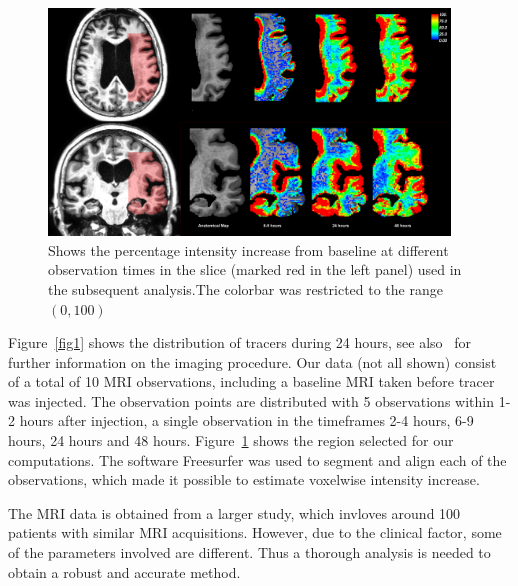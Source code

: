 \documentclass[11pt,a4paper]{article}
\begin{document}
\begin{figure}
\includegraphics[width=0.95\textwidth]{Zoom-PatID-68.png} 
\caption{Shows the percentage intensity increase from baseline at different observation times in the slice (marked red in the left panel) used in the subsequent analysis.The colorbar was restricted to the range $(0,100)$}
\label{fig2} 
\end{figure}
Figure~\ref{fig1} shows the distribution of tracers during 24 hours, see also~\cite{ringstad2018brain} for further information on the imaging procedure.   
Our data (not all shown) consist of a total of 10 MRI observations, including a baseline MRI taken before tracer was injected. The observation points are distributed with 5 observations within 1-2 hours after injection, a single observation in the timeframes 2-4 hours, 6-9 hours, 24 hours and 48 hours. 
Figure~\ref{fig2} shows the region selected for our computations. 
The software Freesurfer \cite{Dale1999179, FischlLiuDale, spf2007, reuter:robreg10} was used to segment and align each of the observations, which made it possible to estimate voxelwise intensity increase. 

The MRI data is obtained from a larger study, which invloves around 100 patients with similar MRI acquisitions. However, due to the clinical factor, some of the parameters involved are different. Thus a thorough analysis is needed to obtain a robust and accurate method.
\end{document}
